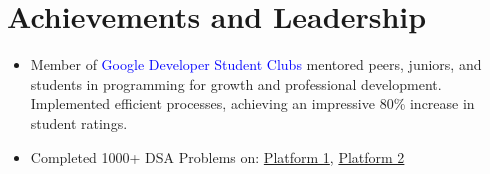 \documentclass[letterpaper,11pt]{article}
\makeatletter
\newcommand{\resumeItem}[1]{
  \item\small{
    {#1 \vspace{-2pt}}
  }
}
\newcommand{\resumeProjectHeading}[2]{
    \item
    \begin{tabular*}{0.97\textwidth}{l@{\extracolsep{\fill}}r}
      \small#1 & #2 \\
    \end{tabular*}\vspace{-7pt}
}
\newcommand{\resumeSubHeadingListStart}{\begin{itemize}[leftmargin=0.15in, label={}]}
\newcommand{\resumeSubHeadingListEnd}{\end{itemize}}
\newcommand{\resumeItemListStart}{\begin{itemize}}
\newcommand{\resumeItemListEnd}{\end{itemize}\vspace{-5pt}}
\makeatother
\begin{document}

            

\section{\textbf{Achievements and Leadership}}
\resumeSubHeadingListStart
    \resumeItemListStart
        \resumeItem{Member of \textcolor{blue}{Google Developer Student Clubs} mentored peers, juniors, and students in programming for growth and professional development. Implemented efficient processes, achieving an impressive 80\% increase in student ratings.}
        \vspace{-0.3cm}
        \resumeItem{Completed 1000+ DSA Problems on: \textcolor{blue}{\href{Link for Platform 1}{Platform 1}}, \textcolor{blue}{\href{Link for Platform 2}{Platform 2}}}
    \resumeItemListEnd
\resumeSubHeadingListEnd



    
\end{document}
